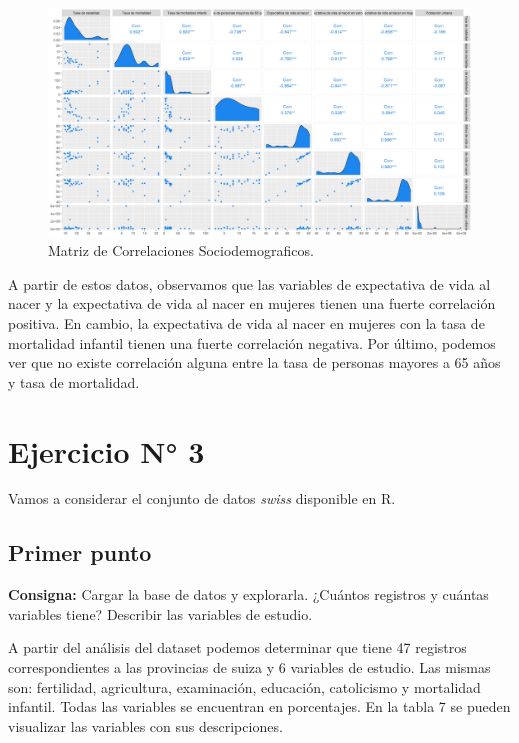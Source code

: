 \documentclass{article} %
\begin{document}
\begin{figure}[H]
	\centering
	\includegraphics[width=1\textwidth]{images/2-5 corr}
	\caption{Matriz de Correlaciones Sociodemograficos.}
	\label{fig:corr1}
\end{figure}

A partir de estos datos, observamos que las variables de expectativa de vida al nacer y la expectativa de vida al nacer en mujeres tienen una fuerte correlación positiva. En cambio, la expectativa de vida al nacer en mujeres con la tasa de mortalidad infantil tienen una fuerte correlación negativa. Por último, podemos ver que no existe correlación alguna entre la tasa de personas mayores a 65 años y tasa de mortalidad.

\section{Ejercicio N° 3}
Vamos a considerar el conjunto de datos \textit{swiss} disponible en R.

\subsection{Primer punto}

\textbf{Consigna:} Cargar la base de datos y explorarla. ¿Cuántos registros y cuántas variables tiene? Describir las variables de estudio.

A partir del análisis del dataset podemos determinar que tiene 47 registros correspondientes a las provincias de suiza y 6 variables de estudio. Las mismas son: fertilidad, agricultura, examinación, educación, catolicismo y mortalidad infantil. Todas las variables se encuentran en porcentajes. En la tabla 7 se pueden visualizar las variables con sus descripciones.
\end{document}
